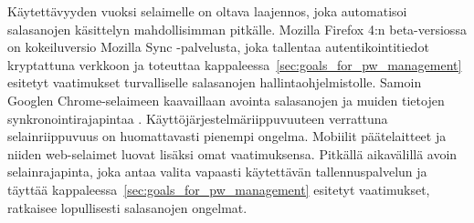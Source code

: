 \documentclass[english,gradu]{tktltiki}
\begin{document}
Käytettävyyden vuoksi selaimelle on oltava laajennos, joka automatisoi salasanojen käsittelyn mahdollisimman
pitkälle. Mozilla Firefox 4:n beta-versiossa on kokeiluversio Mozilla Sync -palvelusta, joka tallentaa
autentikointitiedot kryptattuna verkkoon ja toteuttaa kappaleessa~\ref{sec:goals_for_pw_management} esitetyt
vaatimukset turvalliselle salasanojen hallintaohjelmistolle. Samoin Googlen Chrome-selaimeen kaavaillaan avointa
salasanojen ja muiden tietojen synkronointirajapintaa \cite{chromium_sync_09}. Käyttöjärjestelmäriippuvuuteen
verrattuna selainriippuvuus on huomattavasti pienempi ongelma. Mobiilit päätelaitteet ja niiden web-selaimet
luovat lisäksi omat vaatimuksensa. Pitkällä aikavälillä avoin selainrajapinta, joka antaa valita vapaasti käytettävän tallennuspalvelun ja täyttää kappaleessa~\ref{sec:goals_for_pw_management} esitetyt vaatimukset, ratkaisee lopullisesti salasanojen ongelmat.





\lastpage
\end{document}
